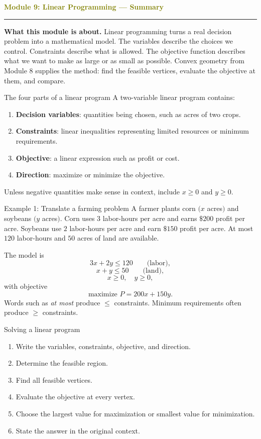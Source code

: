 \documentclass[11pt]{article}
\newcommand{\summaryhead}[2]{%
  \clearpage
  {\Large\bfseries\textcolor{olive}{Module #1: #2 — Summary}}\par
  \vspace{2pt}\textcolor{gold}{\rule{\linewidth}{1.2pt}}\par\smallskip
}
\begin{document}
\summaryhead{9}{Linear Programming}

\textbf{What this module is about.} Linear programming turns a real decision problem into a mathematical model. The variables describe the choices we control. Constraints describe what is allowed. The objective function describes what we want to make as large or as small as possible. Convex geometry from Module 8 supplies the method: find the feasible vertices, evaluate the objective at them, and compare.

\begin{keybox}{The four parts of a linear program}
A two-variable linear program contains:
\begin{enumerate}[label=\arabic*.]
\item \textbf{Decision variables}: quantities being chosen, such as acres of two crops.
\item \textbf{Constraints}: linear inequalities representing limited resources or minimum requirements.
\item \textbf{Objective}: a linear expression such as profit or cost.
\item \textbf{Direction}: maximize or minimize the objective.
\end{enumerate}
Unless negative quantities make sense in context, include \(x\ge0\) and \(y\ge0\).
\end{keybox}

\begin{examplebox}{Example 1: Translate a farming problem}
A farmer plants corn \((x\) acres\()\) and soybeans \((y\) acres\()\). Corn uses \(3\) labor-hours per acre and earns \(\$200\) profit per acre. Soybeans use \(2\) labor-hours per acre and earn \(\$150\) profit per acre. At most \(120\) labor-hours and \(50\) acres of land are available.

The model is
\[
3x+2y\le120\qquad\text{(labor)},
\]
\[
x+y\le50\qquad\text{(land)},
\]
\[
x\ge0,\quad y\ge0,
\]
with objective
\[
\text{maximize }P=200x+150y.
\]
Words such as \emph{at most} produce \(\le\) constraints. Minimum requirements often produce \(\ge\) constraints.
\end{examplebox}

\begin{keybox}{Solving a linear program}
\begin{enumerate}[label=\arabic*.]
\item Write the variables, constraints, objective, and direction.
\item Determine the feasible region.
\item Find all feasible vertices.
\item Evaluate the objective at every vertex.
\item Choose the largest value for maximization or smallest value for minimization.
\item State the answer in the original context.
\end{enumerate}
\end{keybox}
\end{document}
